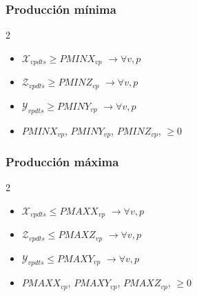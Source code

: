 \subsubsection{Producción mínima}
\begin{multicols}{2}
    \begin{itemize}
        \item \textbf{$\mathcal{X}_{vpdts}\geq PMINX_{vp}$} $\longrightarrow \forall v,p $
        \item \textbf{$\mathcal{Z}_{vpdts}\geq PMINZ_{vp}$} $\longrightarrow \forall v,p $
        \item \textbf{$\mathcal{Y}_{vpdts}\geq PMINY_{vp}$} $\longrightarrow \forall v,p $
        \item $PMINX_{vp}$, $PMINY_{vp}$, $PMINZ_{vp}$, $\geq 0$
    \end{itemize}
\end{multicols}

\subsubsection{Producción máxima}
\begin{multicols}{2}
    \begin{itemize}
        \item \textbf{$\mathcal{X}_{vpdts}\leq PMAXX_{vp}$} $\longrightarrow \forall v,p $
        \item \textbf{$\mathcal{Z}_{vpdts}\leq PMAXZ_{vp}$} $\longrightarrow \forall v,p$
        \item \textbf{$\mathcal{Y}_{vpdts}\leq PMAXY_{vp}$} $\longrightarrow \forall v,p$
        \item $PMAXX_{vp}$, $PMAXY_{vp}$, $PMAXZ_{vp}$, $\geq 0$
    \end{itemize}
\end{multicols}

\pagebreak
